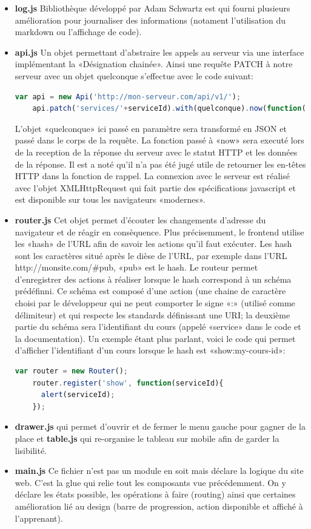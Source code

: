 \documentclass[a4paper,11pt]{report}
\begin{document}
\begin{itemize}
  \item \textbf{log.js} Bibliothèque développé par Adam Schwartz est qui fourni plusieurs amélioration pour journaliser des informations (notament l'utilisation du markdown ou l'affichage de code).
  \item \textbf{api.js} Un objet permettant d'abstraire les appels au serveur via une interface implémentant la «Désignation chainée». Ainsi une requête PATCH à notre serveur avec un objet quelconque s'effectue avec le code suivant:
    \begin{lstlisting}[language=javascript,caption={Requête PATCH à l'api}]
    var api = new Api('http://mon-serveur.com/api/v1/');
    api.patch('services/'+serviceId).with(quelconque).now(function(status, data){});
    \end{lstlisting}
    L'objet «quelconque» ici passé en paramètre sera transformé en JSON et passé dans le corps de la requête. La fonction passé à «now» sera executé lors de la reception de la réponse du serveur avec le statut HTTP et les données de la réponse. Il est a noté qu'il n'a pas été jugé utile de retourner les en-têtes HTTP dans la fonction de rappel. La connexion avec le serveur est réalisé avec l'objet XMLHttpRequest qui fait partie des spécifications javascript et est disponible sur tous les navigateurs «modernes».
  \item \textbf{router.js} Cet objet permet d'écouter les changements d'adresse du navigateur et de réagir en consèquence. Plus précisemment, le frontend utilise les «hash» de l'URL afin de savoir les actions qu'il faut exécuter. Les hash sont les caractères situé après le dièse de l'URL, par exemple dans l'URL http://monsite.com/\#pub, «pub» est le hash.
  Le routeur permet d'enregistrer des actions à réaliser lorsque le hash correspond à un schéma prédéfinni. Ce schéma est composé d'une action (une chaine de caractère choisi par le développeur qui ne peut comporter le signe «:» (utilisé comme délimiteur) et qui respecte les standards définissant une URI; la deuxième partie du schéma sera l'identifiant du cours (appelé «service» dans le code et la documentation).
  Un exemple étant plus parlant, voici le code qui permet d'afficher l'identifiant d'un cours lorsque le hash est «show:my-cours-id»:
    \begin{lstlisting}[language=javascript,caption={Affichage identifiant avec le routeur}]
    var router = new Router();
    router.register('show', function(serviceId){
      alert(serviceId);
    });
    \end{lstlisting}
  \item \textbf{drawer.js} qui permet d'ouvrir et de fermer le menu gauche pour gagner de la place et \textbf{table.js} qui re-organise le tableau sur mobile afin de garder la lisibilité.
  \item \textbf{main.js} Ce fichier n'est pas un module en soit mais déclare la logique du site web. C'est la glue qui relie tout les composants vue précédemment. On y déclare les états possible, les opérations à faire (routing) ainsi que certaines amélioration lié au design (barre de progression, action disponible et affiché à l'apprenant).
\end{itemize}
\end{document}
